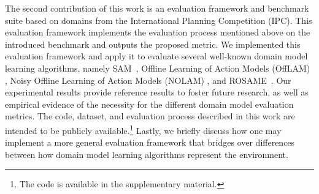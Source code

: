 \documentclass[letterpaper]{article} %
\newcommand{\sam}{\ac{SAM}\xspace}
\newif\ifaddcomments
\newcommand{\roni}[1]{\ifaddcomments{\textcolor{red}{[Roni: #1]}}\fi}
\newcommand{\leo}[1]{\ifaddcomments{\textcolor{pink}{[Leonardo: #1]}}\fi}
\begin{document}
%
The second contribution of this work is an evaluation framework and benchmark suite based on domains from the International Planning Competition (IPC). 
This evaluation framework implements the evaluation process mentioned above on the introduced benchmark and outputs the proposed metric. %
We implemented this evaluation framework and apply it to evaluate several well-known domain model learning algorithms, namely \sam~\cite{juba2021safe}, Offline Learning of Action Models (OffLAM) \citep{LAMANNA2025104256}, Noisy Offline Learning of Action Models (NOLAM) \citep{Lamanna24}, and ROSAME~\cite{xi2024neuro}. 
Our experimental results provide reference results to foster future research, as well as  empirical evidence of the necessity for the different domain model evaluation metrics. 
The code, dataset, and evaluation process described in this work are intended to be publicly available.\footnote{The code is available in the supplementary material.} 
Lastly, we briefly discuss how one may implement a more general evaluation framework that bridges over differences between how domain model learning algorithms represent the environment. 
\end{document}
